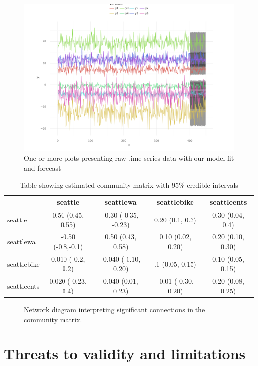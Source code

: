 \documentclass[12pt]{memoir}
\begin{document}
\begin{figure}[h]
  \includegraphics[width=\textwidth]{resources/example_forecast.png}
  \caption{One or more plots presenting raw time series data with our model fit and forecast}
\end{figure}
\clearpage

\begin{table}[h]
\footnotesize
\begin{tabular}{l | c c c c}
  & seattle & seattlewa & seattlebike & seattleents \\ \hline
  seattle & 0.50 (0.45, 0.55) & -0.30 (-0.35, -0.23) & 0.20 (0.1, 0.3) & 0.30 (0.04, 0.4) \\
  seattlewa & -0.50 (-0.8,-0.1) & 0.50 (0.43, 0.58) & 0.10 (0.02, 0.20) & 0.20 (0.10, 0.30) \\
  seattlebike & 0.010 (-0.2, 0.2) & -0.040 (-0.10, 0.20) & .1 (0.05, 0.15) & 0.10 (0.05, 0.15) \\
  seattleents & 0.020 (-0.23, 0.4) & 0.040 (0.01, 0.23) & -0.01 (-0.30, 0.20) & 0.20 (0.08, 0.25) \\ \hline
\end{tabular}
\caption{Table showing estimated community matrix with 95\% credible intervals}
\end{table}


\begin{figure}[h]
  
  \caption{Network diagram interpreting significant connections in the community matrix.}
\end{figure}

\section{Threats to validity and limitations}
\end{document}
